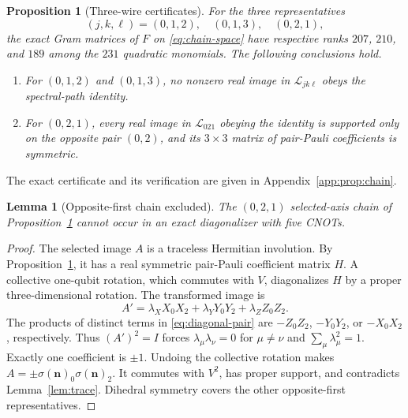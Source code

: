 \documentclass[11pt]{article}
\newtheorem{lemma}{Lemma}
\newtheorem{proposition}{Proposition}
\begin{document}
\begin{proposition}[Three-wire certificates]\label{prop:chain}
For the three representatives
\begin{equation}\label{eq:representatives}
(j,k,\ell)=(0,1,2),\quad(0,1,3),\quad(0,2,1),
\end{equation}
the exact Gram matrices of $F$ on \eqref{eq:chain-space} have respective
ranks $207$, $210$, and $189$ among the $231$ quadratic monomials.
The following conclusions hold.
\begin{enumerate}
\item For $(0,1,2)$ and $(0,1,3)$, no nonzero real image in
      $\mathcal L_{jk\ell}$ obeys the spectral-path identity.
\item For $(0,2,1)$, every real image in
      $\mathcal L_{021}$ obeying the identity is supported only on the
      opposite pair $(0,2)$, and its $3\times3$ matrix of pair-Pauli
      coefficients is symmetric.
\end{enumerate}
\end{proposition}

\noindent The exact certificate and its verification are given in Appendix~\ref{app:prop:chain}.

\begin{lemma}[Opposite-first chain excluded]\label{lem:opposite-chain}
The $(0,2,1)$ selected-axis chain of Proposition~\ref{prop:chain}
cannot occur in an exact diagonalizer with five CNOTs.
\end{lemma}

\begin{proof}
The selected image $A$ is a traceless Hermitian involution.  By
Proposition~\ref{prop:chain}, it has a real symmetric pair-Pauli
coefficient matrix $H$.  A collective one-qubit rotation, which
commutes with $V$, diagonalizes $H$ by a proper three-dimensional
rotation.  The transformed image is
\begin{equation}\label{eq:diagonal-pair}
A'=\lambda_X X_0X_2+\lambda_Y Y_0Y_2+\lambda_Z Z_0Z_2.
\end{equation}
The products of distinct terms in \eqref{eq:diagonal-pair} are
$-Z_0Z_2$, $-Y_0Y_2$, or $-X_0X_2$, respectively.  Thus $(A')^2=I$
forces $\lambda_\mu\lambda_\nu=0$ for $\mu\ne\nu$ and
$\sum_\mu\lambda_\mu^2=1$.  Exactly one coefficient is $\pm1$.
Undoing the collective rotation makes
$A=\pm\sigma(\mathbf n)_0\sigma(\mathbf n)_2$.
It commutes with $V^2$, has proper support, and contradicts
Lemma~\ref{lem:trace}.  Dihedral symmetry covers the other
opposite-first representatives.
\end{proof}
\end{document}
